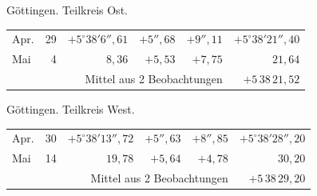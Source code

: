 \noindent\begin{minipage}[t]{.495\textwidth}\centering Göttingen. Teilkreis Ost.\par\smallskip
{\scriptsize\setlength{\tabcolsep}{1pt}\renewcommand{\arraystretch}{1.2}\begin{tabular}{lr|r|r|r|r|}
Apr.&29&$+5^\circ38'6''{,}61$&$+5''{,}68$&$+9''{,}11$&$+5^\circ38'21''{,}40$\\
Mai&4&$8{,}36$&$+5{,}53$&$+7{,}75$&$21{,}64$\\
\cline{6-6}\multicolumn{5}{r}{Mittel aus 2 Beobachtungen}&$+5\,38\,21{,}52$
\end{tabular}}\end{minipage}\hfill\begin{minipage}[t]{.495\textwidth}\centering Göttingen. Teilkreis West.\par\smallskip
{\scriptsize\setlength{\tabcolsep}{1pt}\renewcommand{\arraystretch}{1.2}\begin{tabular}{lr|r|r|r|r}
Apr.&30&$+5^\circ38'13''{,}72$&$+5''{,}63$&$+8''{,}85$&$+5^\circ38'28''{,}20$\\
Mai&14&$19{,}78$&$+5{,}64$&$+4{,}78$&$30{,}20$\\
\cline{6-6}\multicolumn{5}{r}{Mittel aus 2 Beobachtungen}&$+5\,38\,29{,}20$
\end{tabular}}\end{minipage}
\par\vspace{4mm}

